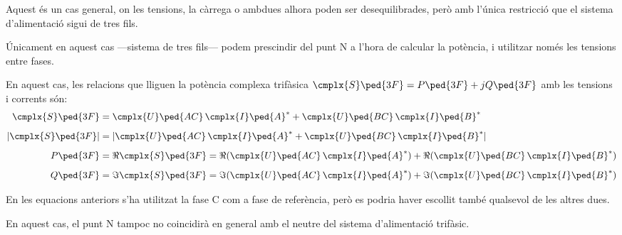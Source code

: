 Aquest és un cas  general, on les tensions, la càrrega o ambdues alhora  poden ser desequilibrades, però amb l'única restricció que
el sistema d'alimentació sigui de tres fils.

 Únicament en aquest cas ---sistema de tres fils--- podem prescindir del punt N a l'hora de
calcular la potència, i utilitzar només les tensions entre fases.

En aquest cas, les relacions que lliguen la potència complexa
trifàsica $\cmplx{S}\ped{3F} = P\ped{3F} + j Q\ped{3F}$ amb les
tensions i corrents són:
\begin{align}
    \cmplx{S}\ped{3F} &= \cmplx{U}\ped{AC} \,\cmplx{I}\ped{A}^*
     +  \cmplx{U}\ped{BC} \,\cmplx{I}\ped{B}^*  \label{eq:s_3f_3fils}\\[2mm]
    |\cmplx{S}\ped{3F}| &= |\cmplx{U}\ped{AC}\, \cmplx{I}\ped{A}^* +
    \cmplx{U}\ped{BC}\, \cmplx{I}\ped{B}^*| \\[2mm]
    P\ped{3F} &= \Re\cmplx{S}\ped{3F}= \Re(\cmplx{U}\ped{AC}\, \cmplx{I}\ped{A}^*) +
    \Re(\cmplx{U}\ped{BC}\, \cmplx{I}\ped{B}^*) \\[2mm]
    Q\ped{3F} &= \Im\cmplx{S}\ped{3F}=\Im(\cmplx{U}\ped{AC} \,\cmplx{I}\ped{A}^*) +
    \Im(\cmplx{U}\ped{BC} \,\cmplx{I}\ped{B}^*)
\end{align}

En les equacions anteriors s'ha utilitzat la fase C com a
fase de referència, però es podria haver escollit també qualsevol de
les altres dues.

En aquest cas, el punt N tampoc no coincidirà en general amb
el neutre del sistema d'alimentació trifàsic.

